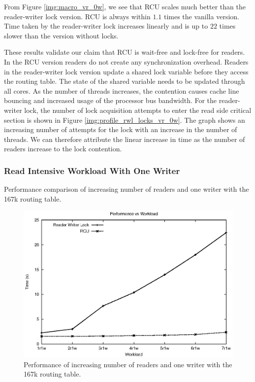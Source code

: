 \documentclass[a4paper,marginparwidth=50pt,marginparsep=10pt]{article}
\begin{document}
From Figure \ref{img:macro_vr_0w}, we see that RCU scales much better
than the reader-writer lock version. RCU is always within $1.1$ times
the vanilla version. Time taken by the reader-writer lock increases
linearly and is up to $22$ times slower than the version without
locks.

These results validate our claim that RCU is wait-free and lock-free
for readers. In the RCU version readers do not create any
synchronization overhead. Readers in the reader-writer lock version
update a shared lock variable before they access the routing
table. The state of the shared variable needs to be updated through
all cores. As the number of threads increases, the contention causes
cache line bouncing and increased usage of the processor bus
bandwidth. For the reader-writer lock, the number of lock acquisition attempts to enter
the read side critical section is shown in Figure \ref{img:profile_rwl_locks_vr_0w}. The graph shows an increasing number of attempts for the lock with an increase in the number of threads. We can therefore attribute the  linear increase in time as the number of readers increase to the lock contention. 

\subsubsection{Read Intensive Workload With One Writer}
\begin{table}[tph]
\begin{center}

\end{center}
\caption{Performance comparison of increasing number of readers and one writer with the 167k routing table.}
\label{tbl:macro_vr_1w}
\end{table}


\begin{figure}[tph]
\includegraphics[scale = 0.7]{../images/graphs/macro_vr_1w}
\caption{Performance of increasing number of readers and one writer with the 167k routing table.}
\label{img:macro_vr_1w}
\end{figure}
\end{document}
